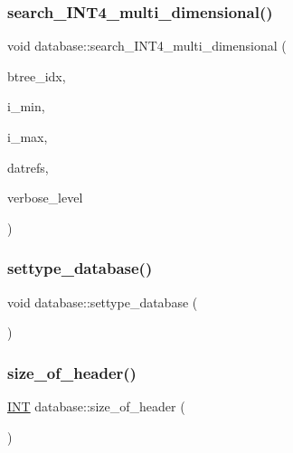 \mbox{\label{classdatabase_a43a31b0e56d1401185a452a6686666aa}} 
\subsubsection{\texorpdfstring{search\+\_\+\+I\+N\+T4\+\_\+multi\+\_\+dimensional()}{search\_INT4\_multi\_dimensional()}}
{\footnotesize\ttfamily void database\+::search\+\_\+\+I\+N\+T4\+\_\+multi\+\_\+dimensional (\begin{DoxyParamCaption}\item[{\mbox{\hyperlink{class_vector}{Vector}} \&}]{btree\+\_\+idx,  }\item[{\mbox{\hyperlink{class_vector}{Vector}} \&}]{i\+\_\+min,  }\item[{\mbox{\hyperlink{class_vector}{Vector}} \&}]{i\+\_\+max,  }\item[{\mbox{\hyperlink{class_vector}{Vector}} \&}]{datrefs,  }\item[{\mbox{\hyperlink{galois_8h_a09fddde158a3a20bd2dcadb609de11dc}{I\+NT}}}]{verbose\+\_\+level }\end{DoxyParamCaption})}

\mbox{\label{classdatabase_a014639aa001462e480eb1f3984839b72}} 
\subsubsection{\texorpdfstring{settype\+\_\+database()}{settype\_database()}}
{\footnotesize\ttfamily void database\+::settype\+\_\+database (\begin{DoxyParamCaption}{ }\end{DoxyParamCaption})}

\mbox{\label{classdatabase_a06a4fb255387e8bac32d98d365a90019}} 
\subsubsection{\texorpdfstring{size\+\_\+of\+\_\+header()}{size\_of\_header()}}
{\footnotesize\ttfamily \mbox{\hyperlink{galois_8h_a09fddde158a3a20bd2dcadb609de11dc}{I\+NT}} database\+::size\+\_\+of\+\_\+header (\begin{DoxyParamCaption}{ }\end{DoxyParamCaption})}

